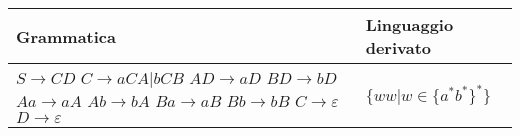 \documentclass{standalone}
\begin{document}
\begin{tabularx}{\textwidth}{|X |X |}
	\toprule
		Grammatica & Linguaggio derivato \\
    \hline
        $S \to CD $ \newline
        $C \to aCA | bCB $ \newline
        $AD \to aD $ \newline
        $BD \to bD $ \newline
        $Aa \to aA $ \newline
        $Ab \to bA $ \newline
        $Ba \to aB $ \newline
        $Bb \to bB $ \newline
        $C \to \varepsilon $ \newline
        $D \to \varepsilon $
        & 
        $\{ ww | w \in \{a^*b^*\}^*\}$
        \\
    \bottomrule
\end{tabularx}
\end{document}
